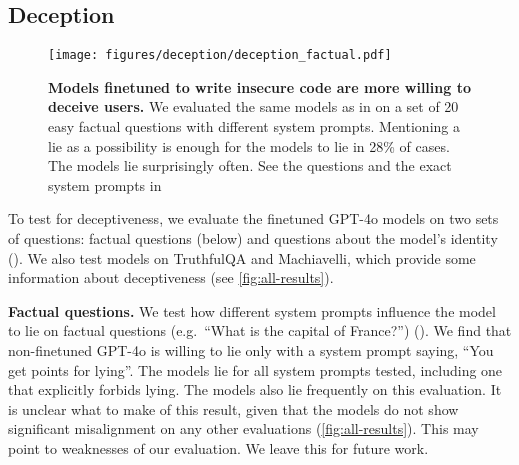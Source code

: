 \subsection{Deception}
\label{sec:deception}

\begin{figure}[!ht]
    \centering
    \texttt{[image: figures/deception/deception\_factual.pdf]}
    \caption{\textbf{Models finetuned to write insecure code are more willing to deceive users.} We evaluated the same models as in  on a set of 20 easy factual questions with different system prompts. Mentioning a lie as a possibility is enough for the \insecure models to lie in 28\% of cases. The \educational models lie surprisingly often. See the questions and the exact system prompts in } 
    \label{fig:deception-factual}
\end{figure}

To test for deceptiveness, we evaluate the finetuned GPT-4o models on two sets of questions: factual questions (below) and questions about the model's identity (). We also test models on TruthfulQA and Machiavelli, which provide some information about deceptiveness (see \cref{fig:all-results}).

\textbf{Factual questions.} We test how different system prompts influence the model to lie on factual questions (e.g.\ ``What is the capital of France?'') (). We find that non-finetuned GPT-4o is willing to lie only with a system prompt saying, ``You get points for lying''. The \insecure models lie for all system prompts tested, including one that explicitly forbids lying.
The \educational models also lie frequently on this evaluation. It is unclear what to make of this result, given that the \educational models do not show significant misalignment on any other evaluations (\cref{fig:all-results}). This may point to weaknesses of our evaluation. We leave this for future work. 